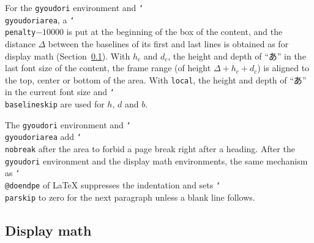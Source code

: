 \documentclass[paper=a4,dvipdfmx]{jlreq}
\newcommand\opt[1]{\texttt{#1}}
\newcommand\env[1]{\texttt{#1}}
\newcommand\cs[1]{\texttt{\char`\\#1}}
\begin{document}
For the \env{gyoudori} environment and \cs{gyoudoriarea}, a \cs{penalty}$-10000$
is put at the beginning of the box of the content, and the distance $\Delta$
between the baselines of its first and last lines is obtained as for display math
(Section~\ref{sec:math}). With $h_c$ and $d_c$, the height and depth of ``あ'' in
the last font size of the content, the frame range (of height
$\Delta+h_c+d_c$) is aligned to the top, center or bottom of the area.
With \opt{local}, the height and depth of ``あ'' in the current font size and
\cs{baselineskip} are used for $h$, $d$ and $b$.

The \env{gyoudori} environment and \cs{gyoudoriarea} add \cs{nobreak} after the
area to forbid a page break right after a heading. After the \env{gyoudori}
environment and the display math environments, the same mechanism as
\cs{@doendpe} of \LaTeX{} suppresses the indentation and sets \cs{parskip} to
zero for the next paragraph unless a blank line follows.

\subsection{Display math}\label{sec:math}
\end{document}
